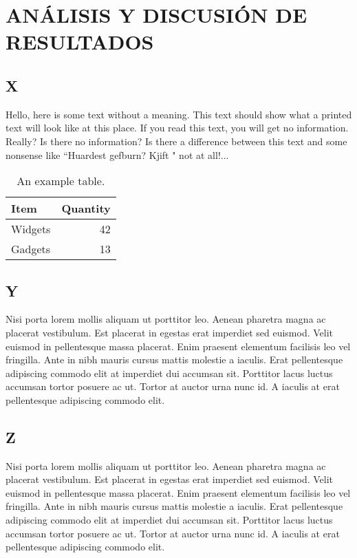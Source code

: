\chapter{ANÁLISIS Y DISCUSIÓN DE RESULTADOS}
\section{X}

Hello, here is some text without a meaning.  This text should 
show what a printed text will look like at this place.  If you 
read this text, you will get no information.  Really?  Is there 
no information?  Is there a difference between this text and some 
nonsense like ``Huardest gefburn?  Kjift " not at all!...

\begin{table}
	\centering
	\begin{tabular}{l|r}
		Item & Quantity \\\hline
		Widgets & 42 \\
		Gadgets & 13
	\end{tabular}
	\caption{\label{tab:widgetxcxs}An example table.}
\end{table}

\section{Y}

Nisi porta lorem mollis aliquam ut porttitor leo. Aenean pharetra magna ac placerat vestibulum. Est placerat in egestas erat imperdiet sed euismod. Velit euismod in pellentesque massa placerat. Enim praesent elementum facilisis leo vel fringilla. Ante in nibh mauris cursus mattis molestie a iaculis. Erat pellentesque adipiscing commodo elit at imperdiet dui accumsan sit. Porttitor lacus luctus accumsan tortor posuere ac ut. Tortor at auctor urna nunc id. A iaculis at erat pellentesque adipiscing commodo elit. 


\section{Z}

Nisi porta lorem mollis aliquam ut porttitor leo. Aenean pharetra magna ac placerat vestibulum. Est placerat in egestas erat imperdiet sed euismod. Velit euismod in pellentesque massa placerat. Enim praesent elementum facilisis leo vel fringilla. Ante in nibh mauris cursus mattis molestie a iaculis. Erat pellentesque adipiscing commodo elit at imperdiet dui accumsan sit. Porttitor lacus luctus accumsan tortor posuere ac ut. Tortor at auctor urna nunc id. A iaculis at erat pellentesque adipiscing commodo elit.
